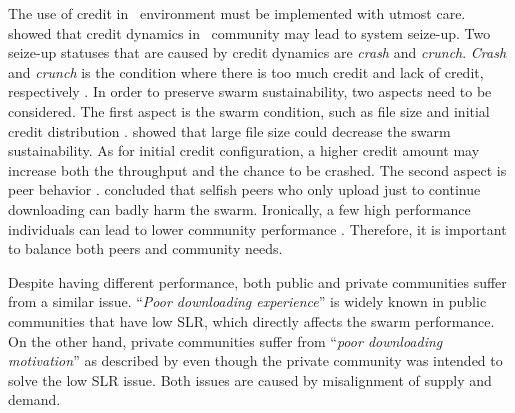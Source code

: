 
The use of credit in \bt~environment must be implemented with utmost care. \citeauthor{2010:crashsustain:rahman} showed that credit dynamics in \bt~community may lead to system seize-up. Two seize-up statuses that are caused by credit dynamics are \textit{crash} and \textit{crunch}. \textit{Crash} and \textit{crunch} is the condition where there is too much credit and lack of credit, respectively \cite{2010:crashsustain:rahman, 2015:sustainabilitypt:vinko}. In order to preserve swarm sustainability, two aspects need to be considered. The first aspect is the swarm condition, such as file size and initial credit distribution \cite{2015:sustainabilitypt:vinko}. \citeauthor{2015:sustainabilitypt:vinko} showed that large file size could decrease the swarm sustainability. As for initial credit configuration, a higher credit amount may increase both the throughput and the chance to be crashed. The second aspect is peer behavior \cite{2010:crashsustain:rahman}. \citeauthor{2010:crashsustain:rahman} concluded that selfish peers who only upload just to continue downloading can badly harm the swarm. Ironically, a few high performance individuals can lead to lower community performance \cite{2015:sustainabilitypt:vinko}. Therefore, it is important to balance both peers and community needs.

Despite having different performance, both public and private communities suffer from a similar issue. ``\textit{Poor downloading experience}'' is widely known in public communities that have low SLR, which directly affects the swarm performance. On the other hand, private communities suffer from ``\textit{poor downloading motivation}'' as described by \citeauthor{2014:sustainabilitytorrent:chen}\cite{2014:sustainabilitytorrent:chen} even though the private community was intended to solve the low SLR issue. Both issues are caused by misalignment of supply and demand.

